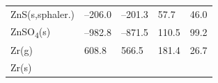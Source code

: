 \documentclass[
  9pt,
]{extbook}
\theoremstyle{definition}
\theoremstyle{definition}
\theoremstyle{definition}
\theoremstyle{remark}
\begin{document}
\begin{longtable}[]{@{}lllll@{}}
\begin{minipage}[t]{0.10\columnwidth}
ZnS(s,sphaler.)\strut
\end{minipage} & \begin{minipage}[t]{0.19\columnwidth}\raggedright
--206.0\strut
\end{minipage} & \begin{minipage}[t]{0.20\columnwidth}\raggedright
--201.3\strut
\end{minipage} & \begin{minipage}[t]{0.18\columnwidth}\raggedright
57.7\strut
\end{minipage} & \begin{minipage}[t]{0.18\columnwidth}\raggedright
46.0\strut
\end{minipage}\tabularnewline
\begin{minipage}[t]{0.10\columnwidth}\raggedright
ZnSO\textsubscript{4}(s)\strut
\end{minipage} & \begin{minipage}[t]{0.19\columnwidth}\raggedright
--982.8\strut
\end{minipage} & \begin{minipage}[t]{0.20\columnwidth}\raggedright
--871.5\strut
\end{minipage} & \begin{minipage}[t]{0.18\columnwidth}\raggedright
110.5\strut
\end{minipage} & \begin{minipage}[t]{0.18\columnwidth}\raggedright
99.2\strut
\end{minipage}\tabularnewline
\begin{minipage}[t]{0.10\columnwidth}\raggedright
Zr(g)\strut
\end{minipage} & \begin{minipage}[t]{0.19\columnwidth}\raggedright
608.8\strut
\end{minipage} & \begin{minipage}[t]{0.20\columnwidth}\raggedright
566.5\strut
\end{minipage} & \begin{minipage}[t]{0.18\columnwidth}\raggedright
181.4\strut
\end{minipage} & \begin{minipage}[t]{0.18\columnwidth}\raggedright
26.7\strut
\end{minipage}\tabularnewline
\begin{minipage}[t]{0.10\columnwidth}\raggedright
Zr(s)\strut
\end{minipage} & \begin{minipage}[t]{0.19\columnwidth}\raggedright

\end{minipage}
\end{longtable}
\end{document}
